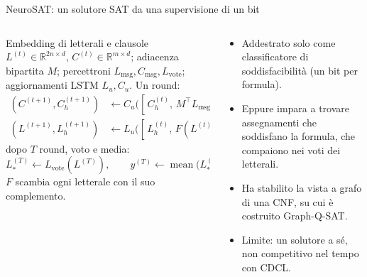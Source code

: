\documentclass[aspectratio=169]{beamer}
\newcommand{\T}[2]{#2}
\newcommand{\T}[2]{#1}
\begin{document}
\begin{frame}{\T{NeuroSAT: a SAT solver from single-bit supervision}{NeuroSAT: un solutore SAT da una supervisione di un bit}}
  \begin{columns}[t]
    \begin{column}{0.54\textwidth}
      \footnotesize
      \T{Literal and clause embeddings}{Embedding di letterali e clausole}
      $L^{(t)}\!\in\!\mathbb{R}^{2n\times d}$, $C^{(t)}\!\in\!\mathbb{R}^{m\times d}$;
      \T{bipartite adjacency $M$; perceptrons}{adiacenza bipartita $M$; percettroni}
      $L_{\text{msg}},C_{\text{msg}},L_{\text{vote}}$; \T{LSTM updates}{aggiornamenti LSTM}
      $L_u,C_u$. \T{One round:}{Un round:}
      \begin{align*}
        (C^{(t+1)}\!,C_h^{(t+1)}) &\leftarrow C_u\big([\,C_h^{(t)},\,M^{\!\top} L_{\text{msg}}(L^{(t)})\,]\big)\\
        (L^{(t+1)}\!,L_h^{(t+1)}) &\leftarrow L_u\big([\,L_h^{(t)},\,F(L^{(t)}),\,M\,C_{\text{msg}}(C^{(t+1)})\,]\big)
      \end{align*}
      \T{after $T$ rounds, vote and average:}{dopo $T$ round, voto e media:}
      \[
        L_*^{(T)}\leftarrow L_{\text{vote}}(L^{(T)}),\qquad
        y^{(T)}\leftarrow \operatorname{mean}\big(L_*^{(T)}\big).
      \]
      \T{$F$ swaps each literal with its complement.}{$F$ scambia ogni letterale con il suo complemento.}
    \end{column}
    \begin{column}{0.46\textwidth}
      \begin{itemize}
        \item \T{Trained only as a classifier of satisfiability (one bit per formula).}%
              {Addestrato solo come classificatore di soddisfacibilit\`a (un bit per formula).}
        \item \T{Yet it learns to find satisfying assignments, which appear in the votes of
              the literals.}%
              {Eppure impara a trovare assegnamenti che soddisfano la formula, che compaiono
              nei voti dei letterali.}
        \item \T{It established the graph view of a CNF, on which Graph-Q-SAT is built.}%
              {Ha stabilito la vista a grafo di una CNF, su cui \`e costruito Graph-Q-SAT.}
        \item \T{Limitation: a standalone solver, not competitive in running time with CDCL.}%
              {Limite: un solutore a s\'e, non competitivo nel tempo con CDCL.}
      \end{itemize}
    \end{column}
  \end{columns}
\end{frame}
\end{document}
